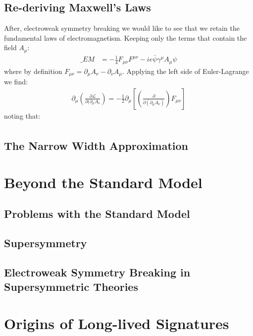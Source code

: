 \subsection{Re-deriving Maxwell's Laws} 

After, electroweak symmetry breaking we would like to see that we retain the fundamental laws of electromagnetism. 
Keeping only the terms that contain the field $A_\mu$:
\begin{align*}
\mathcal_{EM} &= -\frac{1}{4}F_{\mu\nu}F^{\mu\nu}  - ie \bar \psi \gamma^\mu A_\mu \psi 
\end{align*}
where by definition $F_{\mu\nu} = \partial_\mu A_\nu - \partial_\nu A_\mu$. Applying the left side of Euler-Lagrange we find:
\begin{align*}
\partial_\mu \left (\frac{\partial \mathcal L}{\partial(\partial_\mu A_\nu} \right) =  
-\frac{1}{2}\partial_\mu \left [ \left (\frac{\partial}{\partial(\partial_\mu A_\nu)} \right) F_{\mu\nu} \right ] 
\end{align*}
noting that:
\begin{align*}

\end{align*}


\subsection{The Narrow Width Approximation}

\section{Beyond the Standard Model}

\subsection{Problems with the Standard Model}

\subsection{Supersymmetry}

\subsection{Electroweak Symmetry Breaking in Supersymmetric Theories}

\section{Origins of Long-lived Signatures}


